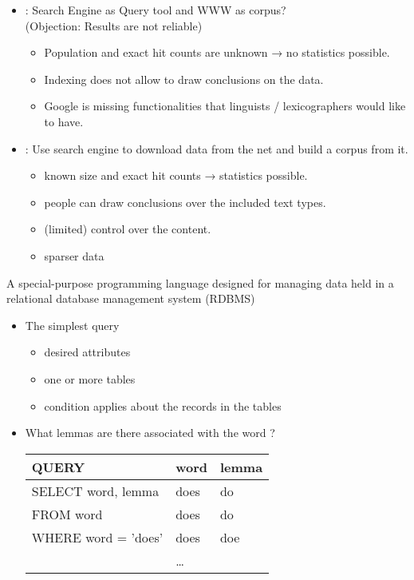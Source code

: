 \documentclass[a4paper,landscape,headrule,footrule,xetex]{foils}
\begin{document}
\begin{itemize}
\item {}: Search Engine as Query tool and WWW as corpus?
\\  (Objection: Results are not reliable)
\begin{itemize}
\item Population and exact hit counts are unknown → no statistics
possible.
\item Indexing does not allow to draw conclusions on the data.
\item[\Bad] Google is missing functionalities that linguists /
lexicographers would like to have.
\end{itemize}
\item {}: Use search engine to download data from the
net and build a corpus from it.
\begin{itemize}
\item known size and exact hit counts → statistics possible.
\item people can draw conclusions over the included text types.
\item (limited) control over the content.
\item[\Bad] sparser data
\end{itemize}
\end{itemize}



A special-purpose programming language designed for managing data held
in a relational database management system (RDBMS)

\begin{itemize} \addtolength{\itemsep}{-1ex}
\item The simplest query
  \begin{itemize}
  \item {} desired attributes
  \item {} one or more tables
  \item {} condition applies about the records in the tables
  \end{itemize}
\item What lemmas are there associated with the word ?

  \begin{tabular}{l|ll}
\textbf{QUERY}  &   \textbf{word} & \textbf{lemma} \\ \hline
SELECT word, lemma  &   does & do \\
FROM word           &   does & do \\
WHERE word = 'does' &   does & doe \\
    & \ldots
  \end{tabular}
\end{itemize}
\end{document}
